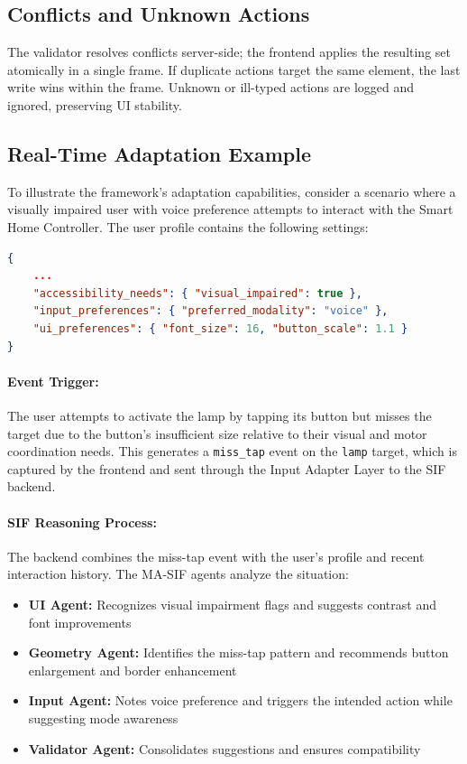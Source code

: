 \documentclass[openany]{book}
\begin{document}
\subsection{Conflicts and Unknown Actions}
The validator resolves conflicts server-side; the frontend applies the resulting set atomically in a single frame. If duplicate actions target the same element, the last write wins within the frame. Unknown or ill-typed actions are logged and ignored, preserving UI stability.

\subsection{Real-Time Adaptation Example}
To illustrate the framework's adaptation capabilities, consider a scenario where a visually impaired user with voice preference attempts to interact with the Smart Home Controller. The user profile contains the following settings:

\begin{lstlisting}[language=json, caption={User profile for visually impaired user, shortened}]
{
    ...
    "accessibility_needs": { "visual_impaired": true },
    "input_preferences": { "preferred_modality": "voice" },
    "ui_preferences": { "font_size": 16, "button_scale": 1.1 }
}
\end{lstlisting}

\paragraph{Event Trigger:} The user attempts to activate the lamp by tapping its button but misses the target due to the button's insufficient size relative to their visual and motor coordination needs. This generates a \texttt{miss\_tap} event on the \texttt{lamp} target, which is captured by the frontend and sent through the Input Adapter Layer to the SIF backend.

\paragraph{SIF Reasoning Process:} The backend combines the miss-tap event with the user's profile and recent interaction history. The MA-SIF agents analyze the situation:
\begin{itemize}
        \item \textbf{UI Agent:} Recognizes visual impairment flags and suggests contrast and font improvements
        \item \textbf{Geometry Agent:} Identifies the miss-tap pattern and recommends button enlargement and border enhancement
        \item \textbf{Input Agent:} Notes voice preference and triggers the intended action while suggesting mode awareness
        \item \textbf{Validator Agent:} Consolidates suggestions and ensures compatibility
\end{itemize}
\end{document}
